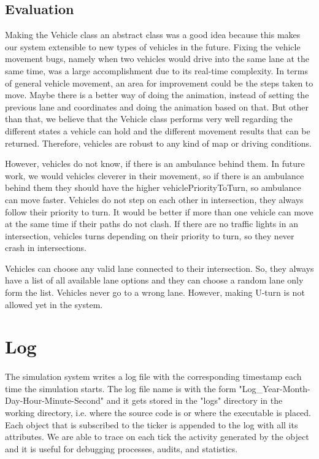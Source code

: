 \documentclass[a4paper,11pt,titlepage]{article}
\begin{document}
\subsection{Evaluation}
Making the Vehicle class an abstract class was a good idea because this makes our system extensible to new types of vehicles in the future. Fixing the vehicle movement bugs, namely when two vehicles would drive into the same lane at the same time, was a large accomplishment due to its real-time complexity. In terms of general vehicle movement, an area for improvement could be the steps taken to move. Maybe there is a better way of doing the animation, instead of setting the previous lane and coordinates and doing the animation based on that. But other than that, we believe that the Vehicle class performs very well regarding the different states a vehicle can hold and the different movement results that can be returned. Therefore, vehicles are robust to any kind of map or driving conditions.

However, vehicles do not know, if there is an ambulance behind them. In future work, we would vehicles cleverer in their movement, so if there is an ambulance behind them they should have the higher vehiclePriorityToTurn, so ambulance can move faster.  Vehicles do not step on each other in intersection, they always follow their priority to turn. It would be better if more than one vehicle can move at the same time if their paths do not clash.
If there are no traffic lights in an intersection, vehicles turns depending on their priority to turn, so they never crash in intersections.

Vehicles can choose any valid lane connected to their intersection. So, they always have a list of all available lane options and they can choose a random lane only form the list. Vehicles never go to a wrong lane. However, making U-turn is not allowed yet in the system.

\section{Log}
\paragraph{}
The simulation system writes a log file with the corresponding timestamp each time the simulation starts. The log file name is with the form "Log\_Year-Month-Day-Hour-Minute-Second" and it gets stored in the "logs" directory in the working directory, i.e. where the source code is or where the executable is placed. Each object that is subscribed to the ticker is appended to the log with all its attributes. We are able to trace on each tick the activity generated by the object and it is useful for debugging processes, audits, and statistics.
\end{document}
